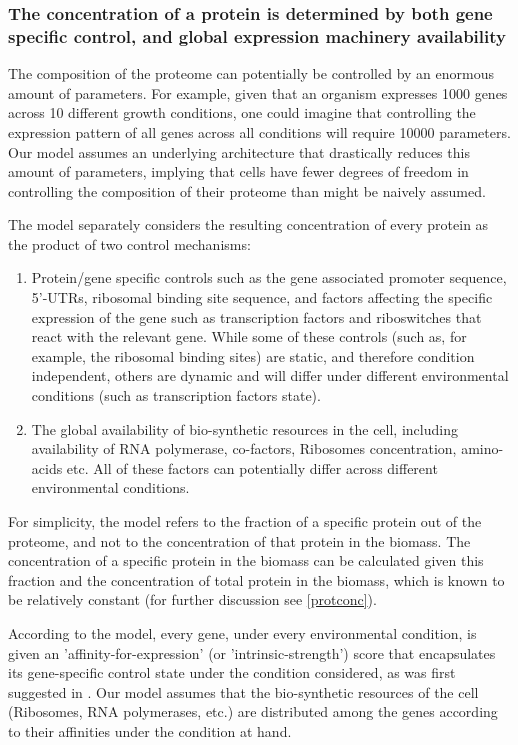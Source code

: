 \subsubsection{The concentration of a protein is determined by both gene specific control, and global
expression machinery availability}
The composition of the proteome can potentially be controlled by an enormous amount of parameters.
For example, given that an organism expresses 1000 genes across 10 different growth conditions, one could imagine that controlling the expression pattern of all genes across all conditions will require 10000 parameters.
Our model assumes an underlying architecture that drastically reduces this amount of parameters, implying that cells have fewer degrees of freedom in controlling the composition of their proteome than might be naively assumed.

The model separately considers the resulting concentration of every protein as the product of two control mechanisms:
\begin{enumerate}
\item Protein/gene specific controls such as the gene associated promoter sequence, 5'-UTRs, ribosomal binding site sequence, and factors affecting the specific expression of the gene such as transcription factors and riboswitches that react with the relevant gene.
  While some of these controls (such as, for example, the ribosomal binding sites) are static, and therefore condition independent, others are dynamic and will differ under different environmental conditions (such as transcription factors state).
\item The global availability of bio-synthetic resources in the cell, including availability of RNA polymerase, co-factors, Ribosomes concentration, amino-acids etc.
  All of these factors can potentially differ across different environmental conditions.
\end{enumerate}

For simplicity, the model refers to the fraction of a specific protein out of the proteome, and not to the concentration of that protein in the biomass.
The concentration of a specific protein in the biomass can be calculated given this fraction and the concentration of total protein in the biomass, which is known to be relatively constant \cite{Bremer1987,Scott2014} (for further discussion see \ref{protconc}).

According to the model, every gene, under every environmental condition, is given an 'affinity-for-expression' (or 'intrinsic-strength') score that encapsulates its gene-specific control state under the condition considered, as was first suggested in \cite{Maaloe1969}.
Our model assumes that the bio-synthetic resources of the cell (Ribosomes, RNA polymerases, etc.) are distributed among the genes according to their affinities under the condition at hand.

